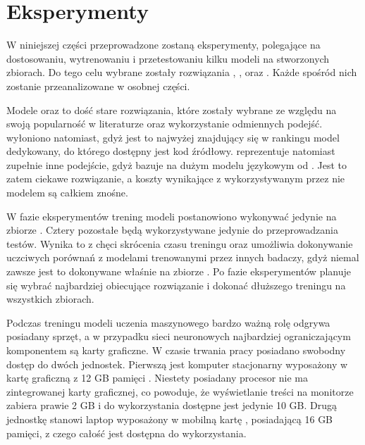 \chapter{Eksperymenty}

W niniejszej części przeprowadzone zostaną eksperymenty, polegające na dostosowaniu, wytrenowaniu i przetestowaniu kilku modeli na stworzonych zbiorach. Do tego celu wybrane zostały rozwiązania , ,  oraz . Każde spośród nich zostanie przeanalizowane w osobnej części. 

Modele  oraz  to dość stare rozwiązania, które zostały wybrane ze względu na swoją popularność w literaturze oraz wykorzystanie odmiennych podejść.  wyłoniono natomiast, gdyż jest to najwyżej znajdujący się w rankingu  model dedykowany, do którego dostępny jest kod źródłowy.  reprezentuje natomiast zupełnie inne podejście, gdyż bazuje na dużym modelu językowym od . Jest to zatem ciekawe rozwiązanie, a koszty wynikające z wykorzystywanym przez nie modelem  są całkiem znośne.

W fazie eksperymentów trening modeli postanowiono wykonywać jedynie na zbiorze . Cztery pozostałe będą wykorzystywane jedynie do przeprowadzania testów. Wynika to z chęci skrócenia czasu treningu oraz umożliwia dokonywanie uczciwych porównań z modelami trenowanymi przez innych badaczy, gdyż niemal zawsze jest to dokonywane właśnie na zbiorze . Po fazie eksperymentów planuje się wybrać najbardziej obiecujące rozwiązanie i dokonać dłuższego treningu na wszystkich zbiorach.

Podczas treningu modeli uczenia maszynowego bardzo ważną rolę odgrywa posiadany sprzęt, a w przypadku sieci neuronowych najbardziej ograniczającym komponentem są karty graficzne. W czasie trwania pracy posiadano swobodny dostęp do dwóch jednostek. Pierwszą jest komputer stacjonarny wyposażony w kartę graficzną  z 12 GB pamięci . Niestety posiadany procesor nie ma zintegrowanej karty graficznej, co powoduje, że wyświetlanie treści na monitorze zabiera prawie 2 GB i do wykorzystania dostępne jest jedynie 10 GB. Drugą jednostkę stanowi laptop  wyposażony w mobilną kartę , posiadającą 16 GB pamięci, z czego całość jest dostępna do wykorzystania.









